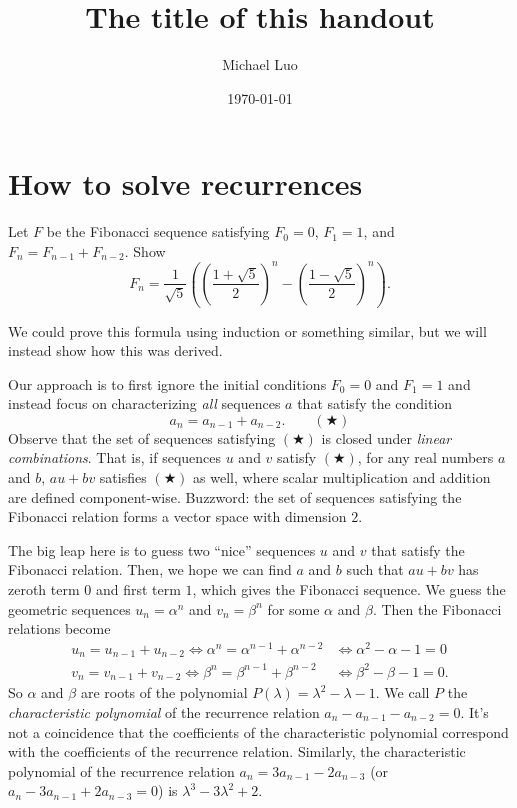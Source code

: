 \documentclass[11pt]{scrartcl}
\title{The title of this handout}
\author{Michael Luo}
\date{\today}
\begin{document}
\maketitle

\section{How to solve recurrences}

\begin{example}
    Let $F$ be the Fibonacci sequence satisfying $F_0 = 0$, $F_1 = 1$, and $F_n = F_{n - 1} + F_{n - 2}$. Show
    \[F_{n} = \frac{1}{\sqrt{5}}\left(\left(\frac{1 + \sqrt5}2\right)^n - \left(\frac{1 - \sqrt5}2\right)^n\right).\]
\end{example}

We could prove this formula using induction or something similar, but we will instead show how this was derived.

Our approach is to first ignore the initial conditions $F_0 = 0$ and $F_1 = 1$
and instead focus on characterizing \emph{all} sequences $a$ that satisfy the condition
\[a_n = a_{n - 1} + a_{n - 2}. \qquad (\bigstar)\]
Observe that the set of sequences satisfying $(\bigstar)$
is closed under \emph{linear combinations}. 
That is, if sequences $u$ and $v$ satisfy $(\bigstar)$,
for any real numbers $a$ and $b$, $au + bv$ satisfies $(\bigstar)$ as well,
where scalar multiplication and addition are defined component-wise.
Buzzword: the set of sequences satisfying the Fibonacci relation forms a vector space with dimension $2$.

The big leap here is to guess two ``nice'' sequences $u$ and $v$ that satisfy the Fibonacci relation.
Then, we hope we can find $a$ and $b$ such that $au + bv$ has zeroth term $0$ and first term $1$, which gives the Fibonacci sequence.
We guess the geometric sequences $u_n = \alpha^n$ and $v_n = \beta^n$ for some $\alpha$ and $\beta$. Then the Fibonacci relations become
\begin{align*}
	u_n = u_{n - 1} + u_{n - 2} \iff \alpha^n = \alpha^{n - 1} + \alpha^{n - 2} &\iff \alpha^2 - \alpha - 1 = 0 \\
	v_n = v_{n - 1} + v_{n - 2} \iff \beta^n = \beta^{n - 1} + \beta^{n - 2} &\iff \beta^2 - \beta - 1 = 0.
\end{align*}
So $\alpha$ and $\beta$ are roots of the polynomial $P(\lambda) = \lambda^2 - \lambda - 1$.
We call $P$ the \emph{characteristic polynomial} of the recurrence relation $a_n - a_{n - 1} - a_{n - 2} = 0$.
It's not a coincidence that the coefficients of the characteristic polynomial correspond with the coefficients of the recurrence relation. Similarly, the characteristic polynomial of the recurrence relation $a_n = 3a_{n - 1} - 2a_{n - 3}$ (or $a_n - 3a_{n - 1} + 2a_{n - 3} = 0$) is $\lambda^3 - 3\lambda^2 + 2$.
\end{document}
